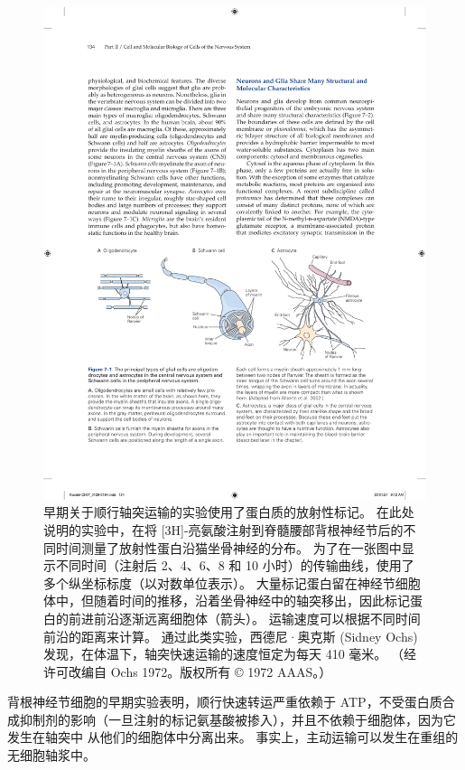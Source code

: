 \begin{figure}[htbp]
	\centering
	\includegraphics[width=1.0\linewidth]{chap07/fig_7_1}
	\caption{早期关于顺行轴突运输的实验使用了蛋白质的放射性标记。 在此处说明的实验中，在将 [3H]-亮氨酸注射到脊髓腰部背根神经节后的不同时间测量了放射性蛋白沿猫坐骨神经的分布。 为了在一张图中显示不同时间（注射后 2、4、6、8 和 10 小时）的传输曲线，使用了多个纵坐标标度（以对数单位表示）。 大量标记蛋白留在神经节细胞体中，但随着时间的推移，沿着坐骨神经中的轴突移出，因此标记蛋白的前进前沿逐渐远离细胞体（箭头）。 运输速度可以根据不同时间前沿的距离来计算。 通过此类实验，西德尼·奥克斯 (Sidney Ochs) 发现，在体温下，轴突快速运输的速度恒定为每天 410 毫米。 （经许可改编自 Ochs 1972。版权所有 © 1972 AAAS。）}
	\label{fig:7_11}
\end{figure}


背根神经节细胞的早期实验表明，顺行快速转运严重依赖于 ATP，不受蛋白质合成抑制剂的影响（一旦注射的标记氨基酸被掺入），并且不依赖于细胞体，因为它发生在轴突中 从他们的细胞体中分离出来。
事实上，主动运输可以发生在重组的无细胞轴浆中。


